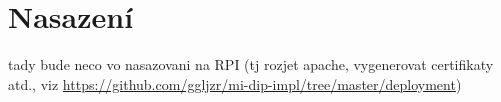 \chapter{Nasazení}

tady bude neco vo nasazovani na RPI (tj rozjet apache, vygenerovat certifikaty atd., viz \url{https://github.com/ggljzr/mi-dip-impl/tree/master/deployment})

\label{sec:dp}